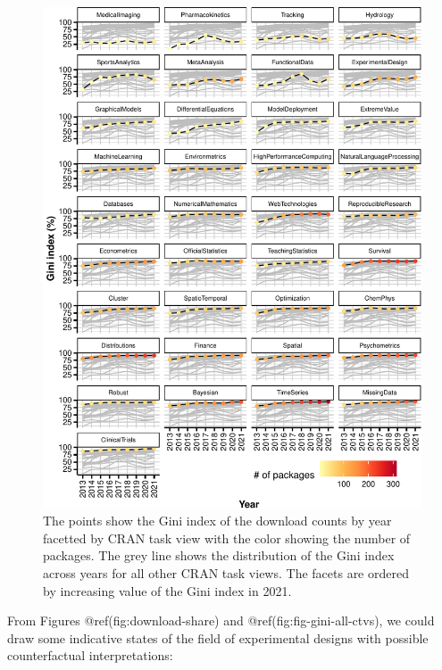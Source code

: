 \documentclass{article}
\begin{document}
\begin{figure}[htbp]

{\centering \includegraphics{figures/fig-gini-all-ctvs-1} 

}

\caption{The points show the Gini index of the download counts by year facetted by CRAN task view with the color showing the number of packages. The grey line shows the distribution of the Gini index across years for all other CRAN task views. The facets are ordered by increasing value of the Gini index in 2021.}\label{fig:fig-gini-all-ctvs}
\end{figure}

From Figures @ref(fig:download-share) and @ref(fig:fig-gini-all-ctvs),
we could draw some indicative states of the field of experimental
designs with possible counterfactual interpretations:
\end{document}
